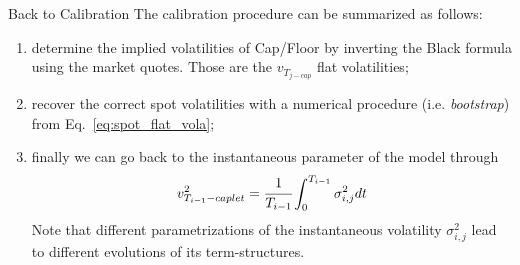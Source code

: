 \documentclass{beamer}
\begin{document}
\begin{frame}{Back to Calibration}
The calibration procedure can be summarized as follows:
\begin{enumerate}
	\item<1-> determine the implied volatilities of Cap/Floor by inverting the Black formula using the market quotes. Those are the $v_{T_{j-cap}}$ flat volatilities;
	\item<2-> recover the correct spot volatilities with a numerical procedure (i.e. \emph{bootstrap}) from Eq.~\ref{eq:spot_flat_vola};
	\item<3-> finally we can go back to the instantaneous parameter of the model through
	\begin{equation}
		v_{T_{i-1}-caplet}^2 =\cfrac{1}{T_{i-1}} \int_0^{T_{i-1}}\sigma^2_{i,j}dt%
	\end{equation}
	Note that different parametrizations of the instantaneous volatility $\sigma_{i,j}^2$ lead to different evolutions of its term-structures.
\end{enumerate}
\end{frame}

\end{document}
